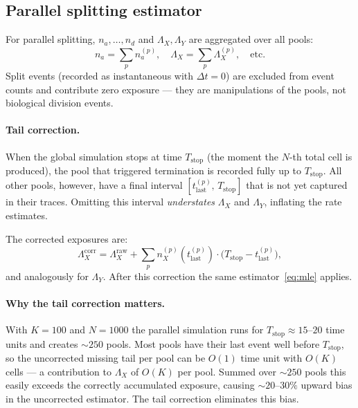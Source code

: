 \documentclass[12pt]{article}
\begin{document}
\subsection{Parallel splitting estimator}

For parallel splitting, $n_a,\ldots,n_d$ and $\Lambda_X, \Lambda_Y$ are
aggregated over all pools:
\[
  n_a = \sum_p n_a^{(p)}, \quad
  \Lambda_X = \sum_p \Lambda_X^{(p)}, \quad \text{etc.}
\]
Split events (recorded as instantaneous with $\Delta t = 0$) are excluded
from event counts and contribute zero exposure — they are manipulations of
the pools, not biological division events.

\paragraph{Tail correction.}
When the global simulation stops at time $T_{\mathrm{stop}}$ (the moment the
$N$-th total cell is produced), the pool that triggered termination is recorded
fully up to $T_{\mathrm{stop}}$.  All other pools, however, have a final
interval $[t^{(p)}_{\mathrm{last}},\, T_{\mathrm{stop}}]$ that is not yet
captured in their traces.  Omitting this interval \emph{understates}
$\Lambda_X$ and $\Lambda_Y$, inflating the rate estimates.

The corrected exposures are:
\begin{equation}
  \Lambda_X^{\mathrm{corr}}
  = \Lambda_X^{\mathrm{raw}}
  + \sum_{p} n_X^{(p)}\!\left(t^{(p)}_{\mathrm{last}}\right)
    \cdot \bigl(T_{\mathrm{stop}} - t^{(p)}_{\mathrm{last}}\bigr),
  \label{eq:tail}
\end{equation}
and analogously for $\Lambda_Y$.  After this correction the same
estimator~\eqref{eq:mle} applies.

\paragraph{Why the tail correction matters.}
With $K = 100$ and $N = 1000$ the parallel simulation runs for
$T_{\mathrm{stop}} \approx 15$--$20$ time units and creates $\sim 250$
pools.  Most pools have their last event well before $T_{\mathrm{stop}}$,
so the uncorrected missing tail per pool can be
$O(1)$ time unit with $O(K)$ cells — a contribution to $\Lambda_X$ of
$O(K)$ per pool.  Summed over $\sim 250$ pools this easily exceeds the
correctly accumulated exposure, causing $\sim 20$--$30\%$ upward bias
in the uncorrected estimator.  The tail correction eliminates this bias.
\end{document}

